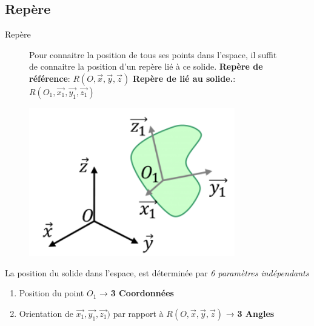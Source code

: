 \documentclass[
  ignorenonframetext,
  aspectratio=169,
  c]{beamer}
\providecommand{\tightlist}{%
  \setlength{\itemsep}{0pt}\setlength{\parskip}{0pt}}\usepackage{longtable,booktabs,array}
\begin{document}
\subsection{Repère}\label{repuxe8re}

\begin{frame}{Repère}
\begin{figure}

\begin{minipage}{0.60\linewidth}
Pour connaitre la position de tous ses points dans l'espace, il suffit
de connaitre la position d'un repère lié à ce solide. \textbf{Repère de
référence}: \(R(O, \vec{x}, \vec{y}, \vec{z})\) \textbf{Repère de lié au
solide.}: \(R(O_1, \vec{x_1}, \vec{y_1}, \vec{z_1})\)\end{minipage}%
%
\begin{minipage}{0.40\linewidth}
\begin{center}
\includegraphics[width=0.8\textwidth,height=\textheight]{CM3/Repere.png}
\end{center}
\end{minipage}%

\end{figure}%

\pause

La position du solide dans l'espace, est déterminée par \emph{6
paramètres indépendants}

\begin{enumerate}
\tightlist
\item
  Position du point \(O_1\) → \textbf{3 Coordonnées}
\item
  Orientation de \(\vec{x_1}, \vec{y_1}, \vec{z_1})\) par rapport à
  \(R(O, \vec{x}, \vec{y}, \vec{z})\) → \textbf{3 Angles}
\end{enumerate}
\end{frame}
\end{document}
